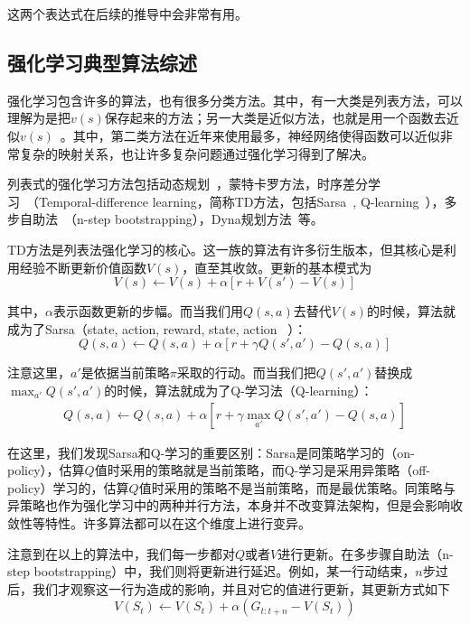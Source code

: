     \par 这两个表达式在后续的推导中会非常有用。
    
  \subsection{强化学习典型算法综述}
      强化学习包含许多的算法，也有很多分类方法。其中，有一大类是列表方法，可以理解为是把$v(s)$保存起来的方法；另一大类是近似方法，也就是用一个函数去近似$v(s)$~\cite{Sutton_book}。其中，第二类方法在近年来使用最多，神经网络使得函数可以近似非常复杂的映射关系，也让许多复杂问题通过强化学习得到了解决。\par
      列表式的强化学习方法包括动态规划~\cite{Bellman_DP}，蒙特卡罗方法，时序差分学习~\cite{Sutton_problem_formulation}（Temporal-difference learning，简称TD方法，包括Sarsa~\cite{Sutton_book}, Q-learning~\cite{Q_learning}），多步自助法~\cite{n_step_bootstrapping}（n-step bootstrapping），Dyna规划方法~\cite{Sutton_book}等。\par
      TD方法是列表法强化学习的核心。这一族的算法有许多衍生版本，但其核心是利用经验不断更新价值函数$V(s)$，直至其收敛。更新的基本模式为
      $$ V(s) \gets V(s) + \alpha [r + V(s') - V(s)] $$
      \par 其中，$\alpha$表示函数更新的步幅。而当我们用$Q(s, a)$去替代$V(s)$的时候，算法就成为了Sarsa（state, action, reward, state, action ~\cite{deepRL_overview}）：
      $$ Q(s, a) \gets Q(s, a) + \alpha [r + \gamma Q(s', a') - Q(s, a)] $$
      \par 注意这里，$a'$是依据当前策略$\pi$采取的行动。而当我们把$Q(s', a')$替换成$\max_{a'} Q(s', a')$的时候，算法就成为了Q-学习法（Q-learning）：
      \begin{align}
      \label{eq:Q_learning}
        Q(s, a) \gets Q(s, a) + \alpha [r + \gamma \max_{a'} Q(s', a') - Q(s, a)]
      \end{align}
      \par 在这里，我们发现Sarsa和Q-学习的重要区别：Sarsa是同策略学习的（on-policy），估算$Q$值时采用的策略就是当前策略，而Q-学习是采用异策略（off-policy）学习的，估算$Q$值时采用的策略不是当前策略，而是最优策略。同策略与异策略也作为强化学习中的两种并行方法，本身并不改变算法架构，但是会影响收敛性等特性。许多算法都可以在这个维度上进行变异。\par
      注意到在以上的算法中，我们每一步都对$Q$或者$V$进行更新。在多步骤自助法（n-step bootstrapping）中，我们则将更新进行延迟。例如，某一行动结束，$n$步过后，我们才观察这一行为造成的影响，并且对它的值进行更新，其更新方式如下
      $$ V(S_t) \gets V(S_t) + \alpha(G_{t:t+n} - V(S_t)) $$
